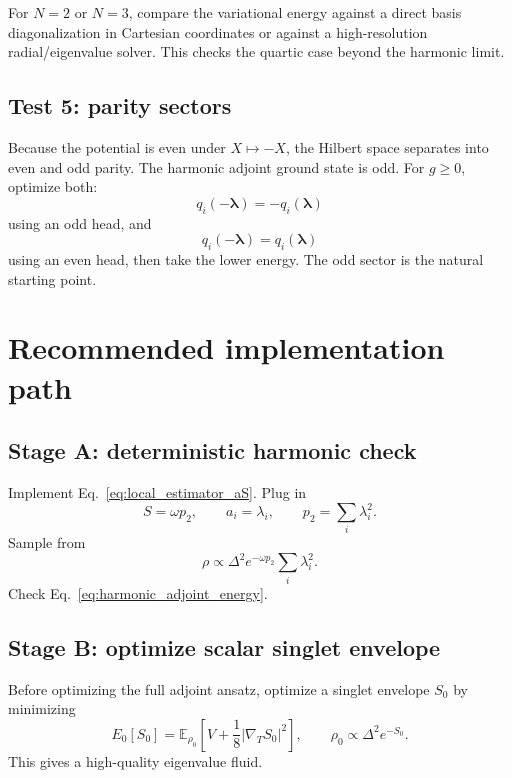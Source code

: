 \documentclass[11pt]{article}
\newcommand{\E}{\mathbb E}
\newcommand{\gradT}{\nabla_{\!T}}
\begin{document}
For $N=2$ or $N=3$, compare the variational energy against a direct basis diagonalization in Cartesian coordinates or against a high-resolution radial/eigenvalue solver.  This checks the quartic case beyond the harmonic limit.

\subsection{Test 5: parity sectors}

Because the potential is even under $X\mapsto -X$, the Hilbert space separates into even and odd parity.  The harmonic adjoint ground state is odd.  For $g\geq0$, optimize both:
\begin{equation}
q_i(-\bm\lambda)=-q_i(\bm\lambda)
\end{equation}
using an odd head, and
\begin{equation}
q_i(-\bm\lambda)=q_i(\bm\lambda)
\end{equation}
using an even head, then take the lower energy.  The odd sector is the natural starting point.

\section{Recommended implementation path}

\subsection{Stage A: deterministic harmonic check}

Implement Eq.~\eqref{eq:local_estimator_aS}.  Plug in
\begin{equation}
S=\omega p_2,
\qquad
 a_i=\lambda_i,
\qquad
p_2=\sum_i\lambda_i^2.
\end{equation}
Sample from
\begin{equation}
\rho\propto\Delta^2e^{-\omega p_2}\sum_i\lambda_i^2.
\end{equation}
Check Eq.~\eqref{eq:harmonic_adjoint_energy}.

\subsection{Stage B: optimize scalar singlet envelope}

Before optimizing the full adjoint ansatz, optimize a singlet envelope $S_0$ by minimizing
\begin{equation}
E_0[S_0]=\E_{\rho_0}\left[V+\frac18|\gradT S_0|^2\right],
\qquad
\rho_0\propto\Delta^2e^{-S_0}.
\end{equation}
This gives a high-quality eigenvalue fluid.
\end{document}
